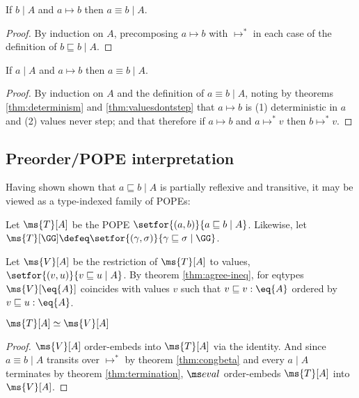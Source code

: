 \documentclass{article}
\newcommand{\ale}{\sqsubseteq}
\newcommand{\aeq}{\equiv}
\newcommand{\ordeq}{\simeq}
\newcommand{\step}{\mapsto}
\newcommand{\steps}{\step^*}
\newcommand{\lr}[2]{#2\mathrel{|}#1}
\newcommand{\lrof}[1]{\ms{T}[#1]}
\newcommand{\Val}[1]{\ms{V}[#1]}
\begin{document}
\begin{lemma}
  If $\lr{A}{b}$ and $a \step b$ then $\lr{A}{a \aeq b}$.
\end{lemma}

\begin{proof}
  By induction on $A$, precomposing $a \step b$ with $\steps$ in each case of
  the definition of $\lr{A}{b \ale b}$.
\end{proof}

\begin{lemma}
  If $\lr{A}{a}$ and $a \step b$ then $\lr{A}{a \aeq b}$.
\end{lemma}

\begin{proof}
  By induction on $A$ and the definition of $\lr{A}{a \aeq b}$, noting by
  theorems \ref{thm:determinism} and \ref{thm:valuesdontstep} that $a \step b$
  is (1) deterministic in $a$ and (2) values never step; and that therefore if
  $a \step b$ and $a \steps v$ then $b \steps v$.
\end{proof}


\subsection{Preorder/POPE interpretation}

Having shown shown that $\lr{A}{a \ale b}$ is partially reflexive and
transitive, it may be viewed as a type-indexed family of POPEs:

\begin{definition}
  Let $\lrof{A}$ be the POPE $\setfor{(a,b)}{\lr{A}{a \ale b}}$. Likewise, let
  $\lrof{\GG} \defeq \setfor{(\gamma,\sigma)}{\lr{\GG}{\gamma \ale \sigma}}$.
\end{definition}

\begin{definition}
  Let $\Val{A}$ be the restriction of $\lrof{A}$ to values,
  $\setfor{(v,u)}{\lr{A}{v \ale u}}$. By theorem \ref{thm:agree-ineq}, for
  eqtypes $\Val{\eq{A}}$ coincides with values $v$ such that $v \ale v : \eq{A}$
  ordered by $v \ale u : \eq{A}$.
\end{definition}

\begin{theorem}\label{thm:terms-values-ordeq}
  $\lrof{A} \ordeq \Val{A}$
\end{theorem}
\begin{proof}
  $\Val{A}$ order-embeds into $\lrof{A}$ via the identity. And since $\lr{A}{a
    \equiv b}$ transits over $\steps$ by theorem \ref{thm:congbeta} and every
  $\lr{A}{a}$ terminates by theorem \ref{thm:termination}, $\evalfn$
  order-embeds $\lrof{A}$ into $\Val{A}$.
\end{proof}
\end{document}
